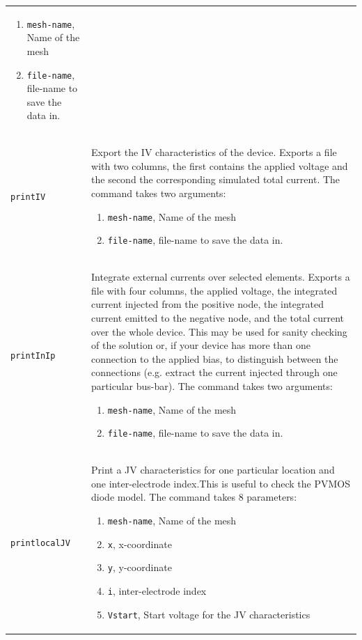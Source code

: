 \documentclass[noshowpacs,preprintnumbers,amsmath,amssymb, letter]{revtex4}
\begin{document}
\begin{longtable}{p{}p{}}
\begin{enumerate}
\item \texttt{mesh-name}, Name of the mesh
\item \texttt{file-name}, file-name to save the data in.
\end{enumerate}\\
\texttt{printIV}		& Export the IV characteristics of the device. Exports a file with two columns, the first contains the applied voltage and the second the corresponding simulated total current. The command takes two arguments:
\begin{enumerate}
\item \texttt{mesh-name}, Name of the mesh
\item \texttt{file-name}, file-name to save the data in.
\end{enumerate}\\
\texttt{printInIp}		& Integrate external currents over selected elements. Exports a file with four columns, the applied voltage, the integrated current injected from the positive node, the integrated current emitted to the negative node, and the total current over the whole device. This may be used for sanity checking of the solution or, if your device has more than one connection to the applied bias, to distinguish between the connections (e.g. extract the current injected through one particular bus-bar). The command takes two arguments:
\begin{enumerate}
\item \texttt{mesh-name}, Name of the mesh
\item \texttt{file-name}, file-name to save the data in.
\end{enumerate}\\
\texttt{printlocalJV}	& Print a JV characteristics for one particular location and one inter-electrode index.This is useful to check the PVMOS diode model. The command takes 8 parameters:
\begin{enumerate}
\item \texttt{mesh-name}, Name of the mesh
\item \texttt{x}, x-coordinate
\item \texttt{y}, y-coordinate
\item \texttt{i}, inter-electrode index
\item \texttt{Vstart}, Start voltage for the JV characteristics

\end{enumerate}
\end{longtable}
\end{document}
